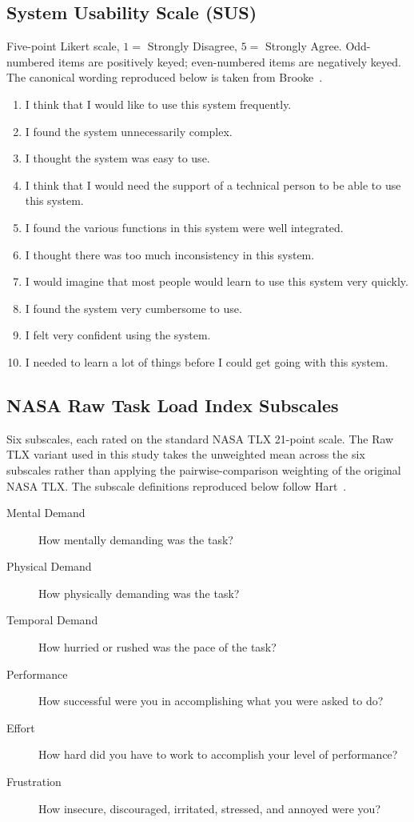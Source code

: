\subsection{System Usability Scale (SUS)}
\label{app:sus-items}

Five-point Likert scale, $1 = $ Strongly Disagree, $5 = $ Strongly Agree. Odd-numbered items are positively keyed; even-numbered items are negatively keyed. The canonical wording reproduced below is taken from Brooke~\cite{Brooke1996}.

\begin{enumerate}
    \item I think that I would like to use this system frequently.
    \item I found the system unnecessarily complex.
    \item I thought the system was easy to use.
    \item I think that I would need the support of a technical person to be able to use this system.
    \item I found the various functions in this system were well integrated.
    \item I thought there was too much inconsistency in this system.
    \item I would imagine that most people would learn to use this system very quickly.
    \item I found the system very cumbersome to use.
    \item I felt very confident using the system.
    \item I needed to learn a lot of things before I could get going with this system.
\end{enumerate}

\subsection{NASA Raw Task Load Index Subscales}
\label{app:rtlx-items}

Six subscales, each rated on the standard NASA TLX 21-point scale. The Raw TLX variant used in this study takes the unweighted mean across the six subscales rather than applying the pairwise-comparison weighting of the original NASA TLX. The subscale definitions reproduced below follow Hart~\cite{Hart2006}.

\begin{description}
    \item[Mental Demand] How mentally demanding was the task?
    \item[Physical Demand] How physically demanding was the task?
    \item[Temporal Demand] How hurried or rushed was the pace of the task?
    \item[Performance] How successful were you in accomplishing what you were asked to do?
    \item[Effort] How hard did you have to work to accomplish your level of performance?
    \item[Frustration] How insecure, discouraged, irritated, stressed, and annoyed were you?
\end{description}

